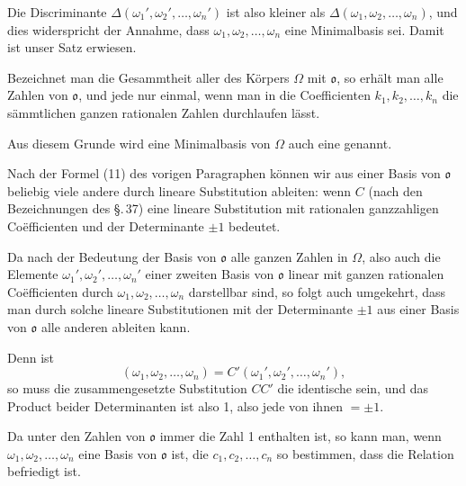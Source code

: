 Die Discriminante $\varDelta(\omega_1', \omega_2', \ldots, \omega_n')$ ist also kleiner als $\varDelta(\omega_1, \omega_2, \ldots, \omega_n)$, und dies widerspricht der Annahme, dass $\omega_1, \omega_2, \ldots, \omega_n$ eine Minimalbasis sei. Damit ist unser Satz erwiesen.

Bezeichnet man die Gesammtheit aller  des Körpers $\Omega$ mit $\mathfrak{o}$, so erhält man alle Zahlen von $\mathfrak{o}$, und jede nur einmal, wenn man in
die Coefficienten $k_1, k_2, \ldots, k_n$ die sämmtlichen ganzen rationalen Zahlen durchlaufen lässt.

Aus diesem Grunde wird eine Minimalbasis von $\Omega$ auch eine  genannt.


Nach der Formel (11) des vorigen Paragraphen können wir aus einer Basis von $\mathfrak{o}$ beliebig viele andere durch lineare Substitution ableiten:
wenn $C$ (nach den Bezeichnungen des \S.\,37) eine lineare Substitution mit rationalen ganzzahligen Coëfficienten und der Determinante $\pm 1$ bedeutet.

Da nach der Bedeutung der Basis von $\mathfrak{o}$ alle ganzen Zahlen in $\Omega$, also auch die Elemente $\omega_1', \omega_2', \ldots, \omega_n'$ einer zweiten Basis von $\mathfrak{o}$ linear mit ganzen rationalen Coëfficienten durch $\omega_1, \omega_2, \ldots, \omega_n$ darstellbar sind, so folgt auch umgekehrt, dass man durch solche lineare Substitutionen mit der Determinante $\pm 1$ aus einer Basis von $\mathfrak{o}$ alle anderen ableiten kann.

Denn ist
\[
(\omega_1, \omega_2, \ldots, \omega_n) = C'(\omega_1', \omega_2', \ldots, \omega_n'),
\]
so muss die zusammengesetzte Substitution $CC'$ die identische sein, und das Product beider Determinanten ist also 1, also jede von ihnen $= \pm 1$.

Da unter den Zahlen von $\mathfrak{o}$ immer die Zahl 1 enthalten ist, so kann man, wenn $\omega_1, \omega_2, \ldots, \omega_n$ eine Basis von $\mathfrak{o}$ ist, die  $c_1, c_2, \ldots, c_n$ so bestimmen, dass die Relation
befriedigt ist.
